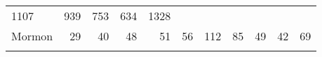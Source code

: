 \documentclass[]{article}
\begin{document}
\begin{longtable}[]{@{}lrrrrrrrrrr@{}}
\begin{minipage}[t]{0.05\columnwidth}
1107\strut
\end{minipage} & \begin{minipage}[t]{0.06\columnwidth}\raggedleft\strut
939\strut
\end{minipage} & \begin{minipage}[t]{0.06\columnwidth}\raggedleft\strut
753\strut
\end{minipage} & \begin{minipage}[t]{0.04\columnwidth}\raggedleft\strut
634\strut
\end{minipage} & \begin{minipage}[t]{0.11\columnwidth}\raggedleft\strut
1328\strut
\end{minipage}\tabularnewline
\begin{minipage}[t]{0.14\columnwidth}\raggedright\strut
Mormon\strut
\end{minipage} & \begin{minipage}[t]{0.04\columnwidth}\raggedleft\strut
29\strut
\end{minipage} & \begin{minipage}[t]{0.05\columnwidth}\raggedleft\strut
40\strut
\end{minipage} & \begin{minipage}[t]{0.05\columnwidth}\raggedleft\strut
48\strut
\end{minipage} & \begin{minipage}[t]{0.05\columnwidth}\raggedleft\strut
51\strut
\end{minipage} & \begin{minipage}[t]{0.05\columnwidth}\raggedleft\strut
56\strut
\end{minipage} & \begin{minipage}[t]{0.05\columnwidth}\raggedleft\strut
112\strut
\end{minipage} & \begin{minipage}[t]{0.06\columnwidth}\raggedleft\strut
85\strut
\end{minipage} & \begin{minipage}[t]{0.06\columnwidth}\raggedleft\strut
49\strut
\end{minipage} & \begin{minipage}[t]{0.04\columnwidth}\raggedleft\strut
42\strut
\end{minipage} & \begin{minipage}[t]{0.11\columnwidth}\raggedleft\strut
69\strut
\end{minipage}\tabularnewline
\begin{minipage}[t]{0.14\columnwidth}\raggedright\strut

\end{minipage}
\end{longtable}
\end{document}
